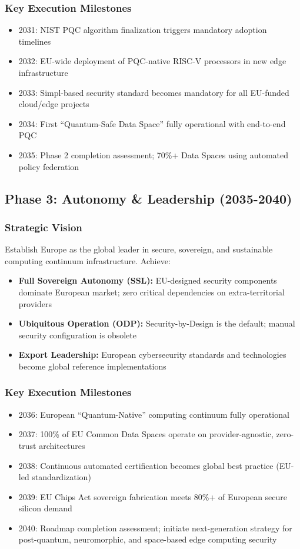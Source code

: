 \documentclass{ieeeaccess}
\begin{document}
\subsubsection*{Key Execution Milestones}
\begin{itemize}
    \item 2031: NIST PQC algorithm finalization triggers mandatory adoption timelines
    \item 2032: EU-wide deployment of PQC-native RISC-V processors in new edge infrastructure
    \item 2033: Simpl-based security standard becomes mandatory for all EU-funded cloud/edge projects
    \item 2034: First ``Quantum-Safe Data Space''  fully operational with end-to-end PQC
    \item 2035: Phase 2 completion assessment; 70\%+ Data Spaces using automated policy federation
\end{itemize}

\subsection*{Phase 3: Autonomy \& Leadership (2035-2040)}

\subsubsection*{Strategic Vision}
Establish Europe as the global leader in secure, sovereign, and sustainable computing continuum infrastructure. Achieve:
\begin{itemize}
    \item \textbf{Full Sovereign Autonomy (SSL):} EU-designed security components dominate European market; zero critical dependencies on extra-territorial providers
    \item \textbf{Ubiquitous Operation (ODP):} Security-by-Design is the default; manual security configuration is obsolete
    \item \textbf{Export Leadership:} European cybersecurity standards and technologies become global reference implementations
\end{itemize}

\subsubsection*{Key Execution Milestones}
\begin{itemize}
    \item 2036: European ``Quantum-Native''  computing continuum fully operational
    \item 2037: 100\% of EU Common Data Spaces operate on provider-agnostic, zero-trust architectures
    \item 2038: Continuous automated certification becomes global best practice (EU-led standardization)
    \item 2039: EU Chips Act sovereign fabrication meets 80\%+ of European secure silicon demand
    \item 2040: Roadmap completion assessment; initiate next-generation strategy for post-quantum, neuromorphic, and space-based edge computing security
\end{itemize}
\end{document}
